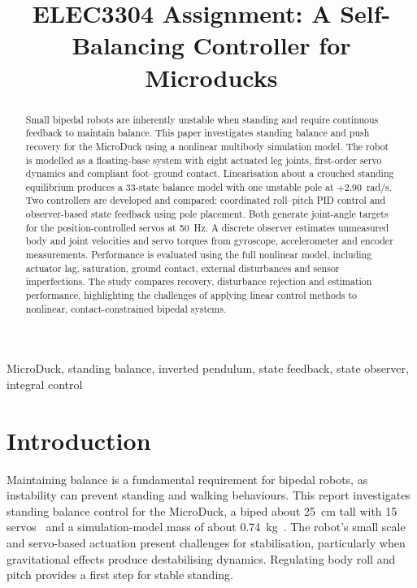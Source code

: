 \documentclass[conference,a4paper]{IEEEtran}
\begin{document}
\title{ELEC3304 Assignment: A Self-Balancing Controller for Microducks}

\author{
\and
{}
}

\maketitle

\begin{abstract}
Small bipedal robots are inherently unstable when standing and require continuous feedback to maintain balance. This paper investigates standing balance and push recovery for the MicroDuck using a nonlinear multibody simulation model. The robot is modelled as a floating-base system with eight actuated leg joints, first-order servo dynamics and compliant foot--ground contact. Linearisation about a crouched standing equilibrium produces a 33-state balance model with one unstable pole at $+2.90$~rad/s. Two controllers are developed and compared: coordinated roll--pitch PID control and observer-based state feedback using pole placement. Both generate joint-angle targets for the position-controlled servos at 50~Hz. A discrete observer estimates unmeasured body and joint velocities and servo torques from gyroscope, accelerometer and encoder measurements. Performance is evaluated using the full nonlinear model, including actuator lag, saturation, ground contact, external disturbances and sensor imperfections. The study compares recovery, disturbance rejection and estimation performance, highlighting the challenges of applying linear control methods to nonlinear, contact-constrained bipedal systems.
\end{abstract}

\begin{IEEEkeywords}
MicroDuck, standing balance, inverted pendulum, state feedback, state observer, integral control
\end{IEEEkeywords}

\section{Introduction}
Maintaining balance is a fundamental requirement for bipedal robots, as instability can prevent standing and walking behaviours. This report investigates standing balance control for the MicroDuck, a biped about 25~cm tall with 15 servos~\cite{openmicroduck_params} and a simulation-model mass of about 0.74~kg~\cite{pollen_mjcf}. The robot's small scale and servo-based actuation present challenges for stabilisation, particularly when gravitational effects produce destabilising dynamics. Regulating body roll and pitch provides a first step for stable standing.
\end{document}

